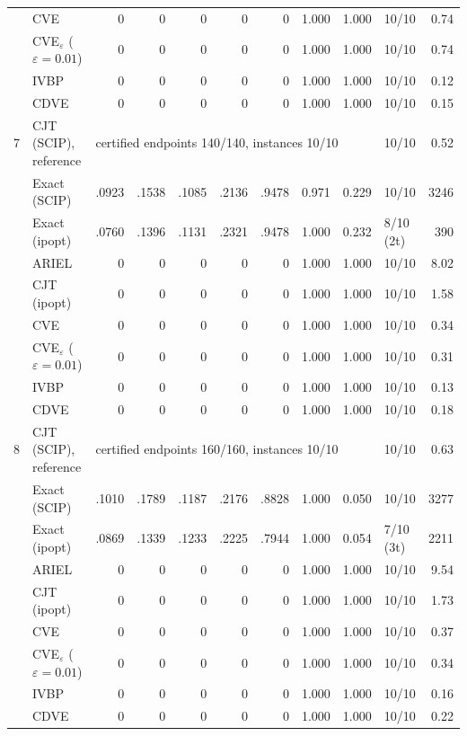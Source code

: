 \begin{table}[htbp]
\begin{tabular}{rlrrrrrrrlr}
 & CVE & 0 & 0 & 0 & 0 & 0 & 1.000 & 1.000 & 10/10 & 0.74 \\
 & CVE$_\varepsilon$ ($\varepsilon{=}0.01$) & 0 & 0 & 0 & 0 & 0 & 1.000 & 1.000 & 10/10 & 0.74 \\
 & IVBP & 0 & 0 & 0 & 0 & 0 & 1.000 & 1.000 & 10/10 & 0.12 \\
 & CDVE & 0 & 0 & 0 & 0 & 0 & 1.000 & 1.000 & 10/10 & 0.15 \\
\midrule
7 & CJT (SCIP), reference & \multicolumn{7}{l}{certified endpoints 140/140, instances 10/10} & 10/10 & 0.52 \\
 & Exact (SCIP) & .0923 & .1538 & .1085 & .2136 & .9478 & 0.971 & 0.229 & 10/10 & 3246 \\
 & Exact (ipopt) & .0760 & .1396 & .1131 & .2321 & .9478 & 1.000 & 0.232 & 8/10 (2t) & 390 \\
 & ARIEL & 0 & 0 & 0 & 0 & 0 & 1.000 & 1.000 & 10/10 & 8.02 \\
 & CJT (ipopt) & 0 & 0 & 0 & 0 & 0 & 1.000 & 1.000 & 10/10 & 1.58 \\
 & CVE & 0 & 0 & 0 & 0 & 0 & 1.000 & 1.000 & 10/10 & 0.34 \\
 & CVE$_\varepsilon$ ($\varepsilon{=}0.01$) & 0 & 0 & 0 & 0 & 0 & 1.000 & 1.000 & 10/10 & 0.31 \\
 & IVBP & 0 & 0 & 0 & 0 & 0 & 1.000 & 1.000 & 10/10 & 0.13 \\
 & CDVE & 0 & 0 & 0 & 0 & 0 & 1.000 & 1.000 & 10/10 & 0.18 \\
\midrule
8 & CJT (SCIP), reference & \multicolumn{7}{l}{certified endpoints 160/160, instances 10/10} & 10/10 & 0.63 \\
 & Exact (SCIP) & .1010 & .1789 & .1187 & .2176 & .8828 & 1.000 & 0.050 & 10/10 & 3277 \\
 & Exact (ipopt) & .0869 & .1339 & .1233 & .2225 & .7944 & 1.000 & 0.054 & 7/10 (3t) & 2211 \\
 & ARIEL & 0 & 0 & 0 & 0 & 0 & 1.000 & 1.000 & 10/10 & 9.54 \\
 & CJT (ipopt) & 0 & 0 & 0 & 0 & 0 & 1.000 & 1.000 & 10/10 & 1.73 \\
 & CVE & 0 & 0 & 0 & 0 & 0 & 1.000 & 1.000 & 10/10 & 0.37 \\
 & CVE$_\varepsilon$ ($\varepsilon{=}0.01$) & 0 & 0 & 0 & 0 & 0 & 1.000 & 1.000 & 10/10 & 0.34 \\
 & IVBP & 0 & 0 & 0 & 0 & 0 & 1.000 & 1.000 & 10/10 & 0.16 \\
 & CDVE & 0 & 0 & 0 & 0 & 0 & 1.000 & 1.000 & 10/10 & 0.22 \\

\end{tabular}
\end{table}
